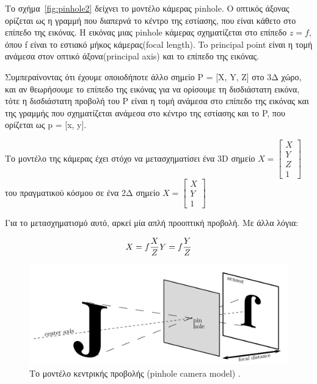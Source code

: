 
Το σχήμα~\ref{fig:pinhole2} δείχνει το μοντέλο κάμερας pinhole. Ο οπτικός άξονας ορίζεται ως η γραμμή που διαπερνά το κέντρο της εστίασης, που είναι κάθετο στο επίπεδο της εικόνας. Η εικόνας μιας pinhole κάμερας σχηματίζεται στο επίπεδο $z=f$, όπου f είναι το εστιακό μήκος κάμερας(focal length).
To principal point είναι η τομή ανάμεσα στον οπτικό άξονα(principal axis) και το επίπεδο της εικόνας. 

Συμπεραίνοντας ότι έχουμε οποιοδήποτε άλλο σημείο P = [X, Y, Z] στο 3Δ χώρο, και αν θεωρήσουμε το επίπεδο της εικόνας για να ορίσουμε τη δισδιάστατη εικόνα, τότε η δισδιάστατη προβολή του P είναι η τομή ανάμεσα στο επίπεδο της εικόνας και της γραμμής που σχηματίζεται ανάμεσα στο κέντρο της εστίασης και το P, που ορίζεται ως p = [x, y]. 


Το μοντέλο της κάμερας έχει στόχο να μετασχηματίσει ένα 3D σημείο 
$X = \begin{bmatrix} X\\ Y\\ Z\\ 1\end{bmatrix}$ του πραγματικού κόσμου σε ένα 2Δ σημείο $X = \begin{bmatrix} X\\ Y\\ 1\end{bmatrix}$

Για το μετασχηματισμό αυτό, αρκεί μία απλή προοπτική προβολή. Με άλλα λόγια:


\begin{equation}
X=f\frac{X}{Z}\\
Y=f\frac{Y}{Z}
\end{equation}




\begin{figure}[H]
    \centering
    \includegraphics[scale=0.5, angle=0]{Files/Figures/pinhole3.png}
    \caption[Το μοντέλο κεντρικής προβολής (pinhole camera model)]{ Το μοντέλο κεντρικής προβολής (pinhole camera model) \cite{pinhole} .}
    \label{fig:pinhole3}
\end{figure}

